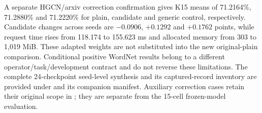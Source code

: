 A separate HGCN/arxiv correction confirmation gives K15 means of 71.2164\%, 71.2880\% and 71.2220\% for plain, candidate and generic control, respectively. Candidate changes across seeds are $-0.0906$, $+0.1292$ and $+0.1762$ points, while request time rises from 118.174 to 155.623 ms and allocated memory from 303 to 1,019 MiB. These adapted weights are not substituted into the new original-plain comparison. Conditional positive WordNet results belong to a different operator/task/development contract and do not reverse these limitations. The complete 24-checkpoint seed-level synthesis and its captured-record inventory are provided under  and its companion manifest. Auxiliary correction cases retain their original scope in ; they are separate from the 15-cell frozen-model evaluation.

